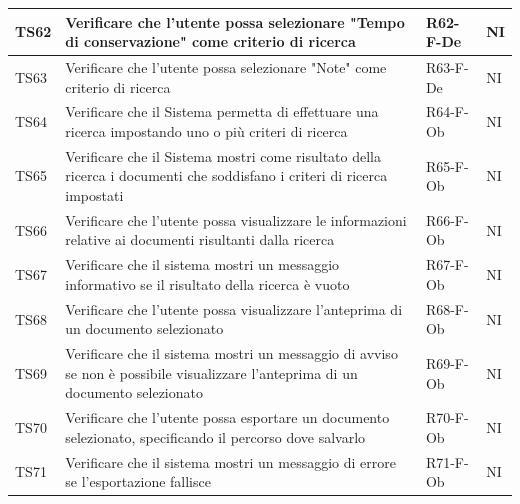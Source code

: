 \documentclass[a4paper,12pt]{article}
\begin{document}
\begin{longtable}{|M{1.2cm}|M{6.3cm}|M{2.5cm}|M{1.5cm}|}
                TS62 & Verificare che l'utente possa selezionare "Tempo di conservazione" come criterio di ricerca & R62-F-De & NI \\
                \hline
                                
                TS63 & Verificare che l'utente possa selezionare "Note" come criterio di ricerca & R63-F-De & NI \\
                \hline
                                
                TS64 & Verificare che il Sistema permetta di effettuare una ricerca impostando uno o più criteri di ricerca & R64-F-Ob & NI \\
                \hline
                                
                TS65 & Verificare che il Sistema mostri come risultato della ricerca i documenti che soddisfano i criteri di ricerca impostati& R65-F-Ob & NI \\
                \hline
                                
                TS66 & Verificare che l'utente possa visualizzare le informazioni relative ai documenti risultanti dalla ricerca & R66-F-Ob & NI \\
                \hline
                                
                TS67 & Verificare che il sistema mostri un messaggio informativo se il risultato della ricerca è vuoto & R67-F-Ob & NI \\
                \hline
                                
                TS68 & Verificare che l'utente possa visualizzare l'anteprima di un documento selezionato & R68-F-Ob & NI \\
                \hline
                                
                TS69 & Verificare che il sistema mostri un messaggio di avviso se non è possibile visualizzare l'anteprima di un documento selezionato & R69-F-Ob & NI \\
                \hline
                                
                TS70 & Verificare che l'utente possa esportare un documento selezionato, specificando il percorso dove salvarlo & R70-F-Ob & NI \\
                \hline
                                
                TS71 & Verificare che il sistema mostri un messaggio di errore se l'esportazione fallisce & R71-F-Ob & NI \\
                \hline
                                

\end{longtable}
\end{document}

